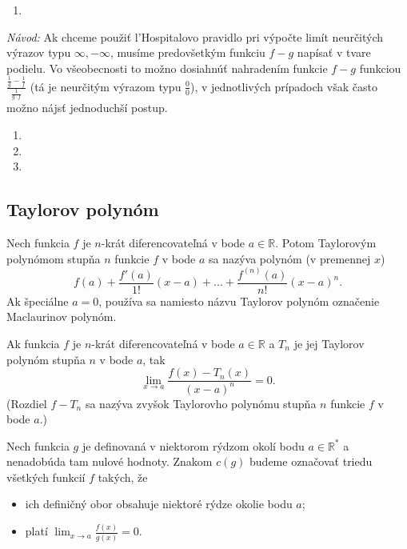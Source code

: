 \begin{enumerate}[resume]
	\item {}
\end{enumerate}

\textit{Návod:}
Ak chceme použiť l'Hospitalovo pravidlo pri výpočte limít neurčitých výrazov typu $\infty,-\infty$, musíme predovšetkým funkciu $f-g$ napísať v tvare podielu. Vo všeobecnosti to možno dosiahnúť nahradením funkcie $f-g$ funkciou $\frac{\frac{1}{g}-\frac{1}{f}}{\frac{1}{g\cdot f}}$ (tá je neurčitým výrazom typu $\frac{0}{0}$), v jednotlivých prípadoch však často možno nájsť jednoduchší postup.

\begin{enumerate}[resume]
	\item {}
	\item {}
	\item {}
\end{enumerate}

\subsection{Taylorov polynóm}
Nech funkcia $f$ je $n$-krát diferencovateľná v bode $a\in\mathbb{R}$. Potom Taylorovým polynómom stupňa $n$ funkcie $f$ v bode $a$ sa nazýva polynóm (v premennej $x$)
$$f(a)+\frac{f'(a)}{1!}(x-a)+...+\frac{f^{(n)}(a)}{n!}(x-a)^n.$$
Ak špeciálne $a=0$, používa sa namiesto názvu Taylorov polynóm označenie Maclaurinov polynóm.

\begin{veta}
Ak funkcia $f$ je $n$-krát diferencovateľná v bode $a\in\mathbb{R}$ a $T_n$ je jej Taylorov polynóm stupňa $n$ v bode $a$, tak $$\lim_{x\rightarrow a}\frac{f(x)-T_n(x)}{(x-a)^n}=0.$$
(Rozdiel $f-T_n$ sa nazýva zvyšok Taylorovho polynómu stupňa $n$ funkcie $f$ v bode $a$.)
\end{veta}

Nech funkcia $g$ je definovaná v niektorom rýdzom okolí bodu $a\in\mathbb{R^*}$ a nenadobúda tam nulové hodnoty. Znakom $c(g)$ budeme označovať triedu všetkých funkcií $f$ takých, že
\begin{itemize}
\item ich definičný obor obsahuje niektoré rýdze okolie bodu $a$;
\item platí $\lim_{x\rightarrow a}\frac{f(x)}{g(x)}=0$.
\end{itemize}

